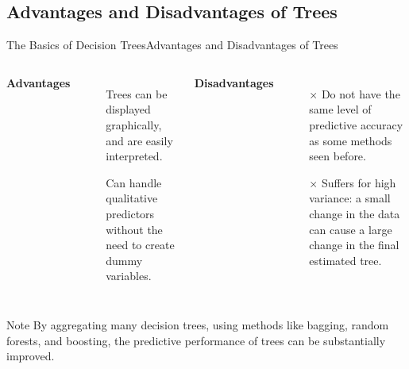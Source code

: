 \subsection{Advantages and Disadvantages of Trees}
\begin{frame}{The Basics of Decision Trees}{Advantages and Disadvantages of Trees}

\begin{columns}[T]
    \textbf{Advantages}
    \begin{itemize}
        \item[\checkmark] Trees can be displayed graphically, and are easily interpreted. \pause 

         \item[\checkmark] Can handle qualitative predictors without the need to create dummy variables. \pause 
    \end{itemize}


    \textbf{Disadvantages}
    \begin{itemize}
        \item[$\times$] Do not have the same level of predictive accuracy as some methods seen before. \pause 

         \item[$\times$] Suffers for high variance: a small change in the data can cause a large change in the final estimated tree. \pause 

    \end{itemize}
\end{columns}

\begin{block}{Note}
    By aggregating many decision trees, using methods like bagging, random forests, and boosting, the predictive performance of trees can be substantially improved.
\end{block}
    
\end{frame}
